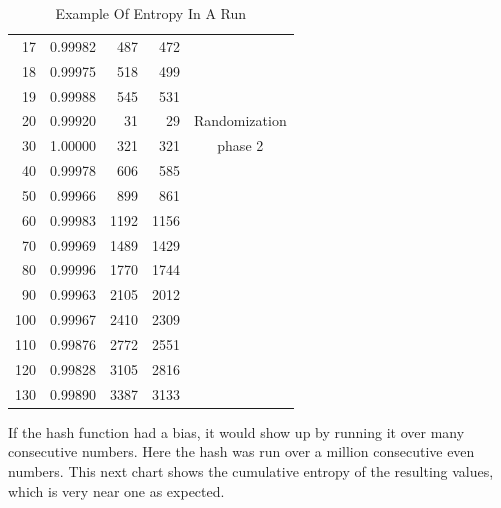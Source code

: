 \documentclass[preprint]{sigplanconf}
\begin{document}
\begin{table} [ht]
\begin{center}
\begin{tabular}{|r|r|r|r|c|}
            17            & 0.99982          & 487           & 472            &                \\
            18            & 0.99975          & 518           & 499            &                \\
            19            & 0.99988          & 545           & 531            &                \\
            \hline
            20            & 0.99920          & 31            & 29             & Randomization  \\
            30            & 1.00000          & 321           & 321            & phase 2        \\
            40            & 0.99978          & 606           & 585            &                \\
            50            & 0.99966          & 899           & 861            &                \\
            60            & 0.99983          & 1192          & 1156           &                \\
            70            & 0.99969          & 1489          & 1429           &                \\
            80            & 0.99996          & 1770          & 1744           &                \\
            90            & 0.99963          & 2105          & 2012           &                \\
            100           & 0.99967          & 2410          & 2309           &                \\
            110           & 0.99876          & 2772          & 2551           &                \\
            120           & 0.99828          & 3105          & 2816           &                \\
            130           & 0.99890          & 3387          & 3133           &                \\
            \hline
        \end{tabular}
        \caption{Example Of Entropy In A Run}
        \label{tab-5}
    \end{center}
\end{table}

\newpage

If the hash function had a bias, it would show up by running it over many consecutive numbers. Here the hash was run over a million consecutive even numbers. This next chart shows the cumulative entropy of the resulting values, which is very near one as expected.
\end{document}
